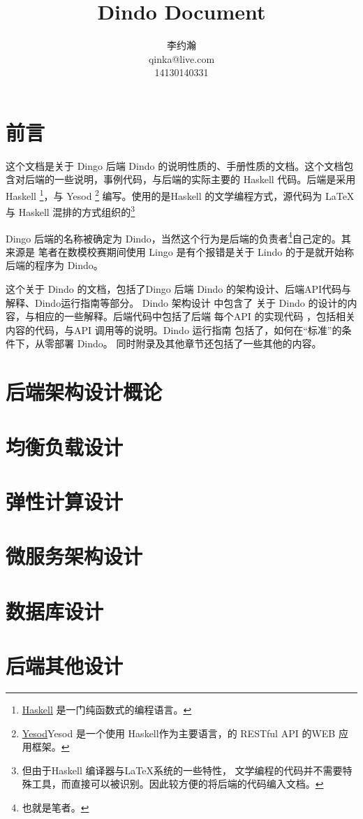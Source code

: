 \documentclass{dingo}
\title{Dindo Document}
\author{李约瀚\\qinka@live.com\\14130140331}
\begin{document}
	\makecover
    \section*{前言}
    这个文档是关于 Dingo 后端 Dindo 的说明性质的、手册性质的文档。这个文档包含对后端的一些说明，事例代码，与后端的实际主要的 Haskell
    代码。后端是采用 Haskell \footnote{\href{https://www.haskell.org}{Haskell} 是一门纯函数式的编程语言。}，与 Yesod 
    \footnote{\href{http://www.yesodweb.com}{Yesod}Yesod 是一个使用 Haskell作为主要语言，的 RESTful API 的WEB 应用框架。}
    编写。使用的是Haskell 的文学编程方式，源代码为 \LaTeX 与 Haskell 混排的方式组织的\footnote{但由于Haskell 编译器与\LaTeX 系统的一些特性，
        文学编程的代码并不需要特殊工具，而直接可以被识别。因此较方便的将后端的代码编入文档。}
    
    Dingo 后端的名称被确定为 Dindo，当然这个行为是后端的负责者\footnote{也就是笔者。}自己定的。其来源是 笔者在数模校赛期间使用
    Lingo 是有个报错是关于 Lindo 的于是就开始称后端的程序为 Dindo。
    
    这个关于 Dindo 的文档，包括了Dingo 后端 Dindo 的架构设计、后端API代码与解释、Dindo运行指南等部分。
    Dindo 架构设计 中包含了 关于 Dindo 的设计的内容，与相应的一些解释。后端代码中包括了后端 每个API 的实现代码
    ，包括相关内容的代码，与API 调用等的说明。Dindo 运行指南 包括了，如何在“标准”的条件下，从零部署 Dindo。
    同时附录及其他章节还包括了一些其他的内容。
    \newpage
	\makecontent
    \section{后端架构设计概论}
    \section{均衡负载设计}
    \section{弹性计算设计}
    \section{微服务架构设计}
    \section{数据库设计}
    \section{后端其他设计}
\end{document}
